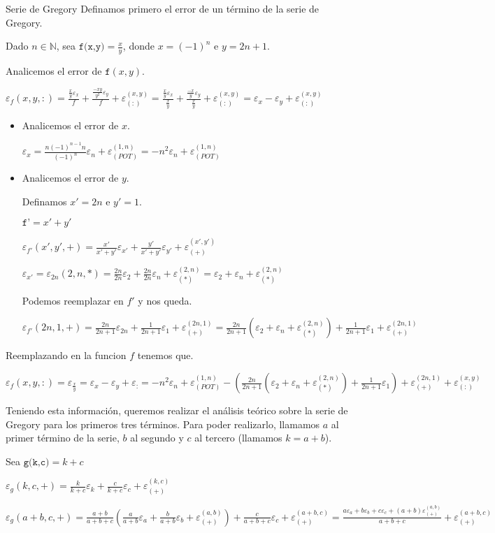 \documentclass[12pt,titlepage]{article}
\newcommand{\func}[2]{\texttt{#1}(#2)}
\newcommand{\funcFull}[2]{\texttt{#1}=#2}
\newcommand{\e}[2]{\varepsilon _{#1}({#2})}
\newcommand{\er}[2]{\varepsilon _{({#1})}^{({#2})}}
\newcommand{\ev}[1]{\varepsilon _{#1}}
\newcommand{\N}{\mathbb{N}}
\begin{document}
	\begin{section}{Serie de Gregory}
		Definamos primero el error de un término de la serie de Gregory. 

		Dado $n \in \N$, sea $\funcFull{f(x,y)} {\frac{x}{y}}$, donde $x=(-1)^n$ e $y=2n+1$.
		
		Analicemos el error de $\func{f}{x,y}$.
		
		$\funcFull{$\e{f}{x,y,:}$}{\frac{\frac{x}{y}\ev{x}}{f} + \frac{\frac{-xy}{y^2}\ev{y}}{f} + \er{:}{x,y}} = 
		\frac{\frac{x}{y}\ev{x}}{\frac{x}{y}} + \frac{\frac{-x}{y}\ev{y}}{\frac{x}{y}} + \er{:}{x,y} = \ev{x} - \ev{y} + \er{:}{x,y}$
		
		\begin{itemize}
	
		\item Analicemos el error de $x$.
		
		$\funcFull{$\ev{x}$}{\frac{n(-1)^{n-1}n}{(-1)^n}\ev{n} + \er{POT}{1,n}} = -n^2\ev{n} + \er{POT}{1,n}$
		
		\item Analicemos el error de $y$.
		
		Definamos $x' = 2n$ e $y'=1$.
		
		$\funcFull{f'}{x'+y'}$
		
		$\e{f'}{x',y',+} = \frac{x'}{x'+y'}\ev{x'} + \frac{y'}{x'+y'}\ev{y'} + \er{+}{x',y'}$
		
		$\ev{x'} = \e{2n}{2,n,*} = \frac{2n}{2n}\ev{2} + \frac{2n}{2n}\ev{n} + \er{*}{2,n} = \ev{2} + \ev{n} + \er{*}{2,n}$
		
		
		Podemos reemplazar en $f'$ y nos queda.
		
		$\e{f'}{2n,1,+} = \frac{2n}{2n+1}\ev{2n} + \frac{1}{2n+1}\ev{1} + \er{+}{2n,1} = \frac{2n}{2n+1}(\ev{2} + \ev{n} + \er{*}{2,n}) + \frac{1}{2n+1}\ev{1} + \er{+}{2n,1}$
		\end{itemize}
		Reemplazando en la funcion $f$ tenemos que.
		
		$\e{f}{x,y,:} = \ev{\frac{x}{y}} = \ev{x} - \ev{y} + \ev{:} = -n^2\ev{n} + \er{POT}{1,n} - (\frac{2n}{2n+1}(\ev{2} + \ev{n} + \er{*}{2,n}) + \frac{1}{2n+1}\ev{1}) + \er{+}{2n,1} + \er{:}{x,y}$
		
		Teniendo esta información, queremos realizar el análisis teórico sobre la serie de Gregory para los primeros tres términos. Para poder realizarlo, llamamos $a$ al primer término de la serie,
		$b$ al segundo y $c$ al tercero (llamamos $k=a+b$).
		
		Sea $\funcFull{g(k,c)}{k+c}$
		
		$\e{g}{k,c,+} = \frac{k}{k+c}\ev{k} + \frac{c}{k+c}\ev{c} + \er{+}{k,c}$
		
		$\e{g}{a+b,c,+} = \frac{a+b}{a+b+c}(\frac{a}{a+b}\ev{a} + \frac{b}{a+b}\ev{b} + \er{+}{a,b}) + \frac{c}{a+b+c}\ev{c} + \er{+}{a+b,c} = 
		\frac{a\ev{a} + b\ev{b} + c\ev{c} + (a+b)\er{+}{a,b}}{a+b+c} + \er{+}{a+b,c}$
				
				
		
	\end{section}
\end{document}
